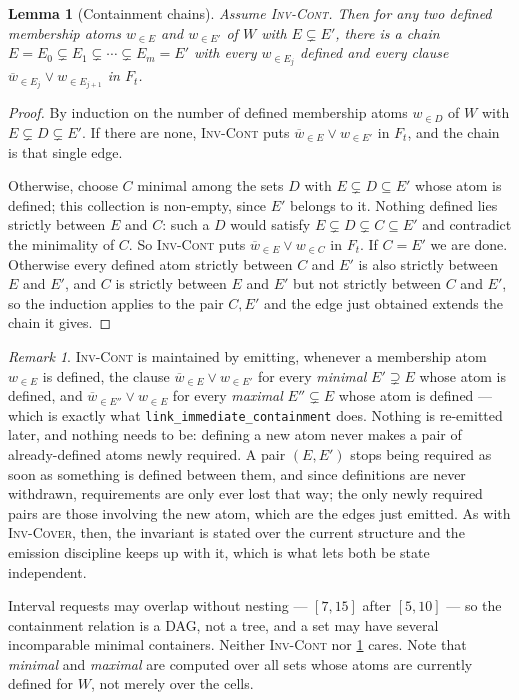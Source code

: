 \documentclass[11pt,a4paper]{article}
\theoremstyle{plain}
\newtheorem{lemmaN}{Lemma}
\theoremstyle{definition}
\theoremstyle{remark}
\newtheorem*{remark}{Remark}
\newcommand{\atset}[2]{#1_{\in #2}}
\newcommand{\natset}[2]{\overline{#1}_{\in #2}}
\newcommand{\inv}[1]{\textnormal{\textsc{Inv-#1}}}
\newcommand{\code}[1]{\texttt{#1}}
\newcommand{\invCover}{\inv{Cover}}
\newcommand{\invCont}{\inv{Cont}}
\begin{document}
\begin{lemmaN}[Containment chains]
\label{lem:contclosure}
Assume \invCont{}.  Then for any two defined membership atoms $\atset{w}{E}$ and
$\atset{w}{E'}$ of $W$ with $E\subsetneq E'$, there is a chain
$E=E_0\subsetneq E_1\subsetneq\cdots\subsetneq E_m=E'$ with every
$\atset{w}{E_j}$ defined and every clause
$\natset{w}{E_j}\vee\atset{w}{E_{j+1}}$ in $F_t$.
\end{lemmaN}

\begin{proof}
By induction on the number of defined membership atoms $\atset{w}{D}$ of $W$ with
$E\subsetneq D\subsetneq E'$.  If there are none, \invCont{} puts
$\natset{w}{E}\vee\atset{w}{E'}$ in $F_t$, and the chain is that single edge.

Otherwise, choose $C$ minimal among the sets $D$ with $E\subsetneq D\subseteq
E'$ whose atom is defined; this collection is non-empty, since $E'$ belongs to
it.  Nothing defined lies strictly between $E$ and $C$: such a $D$ would satisfy
$E\subsetneq D\subsetneq C\subseteq E'$ and contradict the minimality of $C$.
So \invCont{} puts $\natset{w}{E}\vee\atset{w}{C}$ in $F_t$.  If $C=E'$ we are
done.  Otherwise every defined atom strictly between $C$ and $E'$ is also
strictly between $E$ and $E'$, and $C$ is strictly between $E$ and $E'$ but not
strictly between $C$ and $E'$, so the induction applies to the pair $C,E'$ and
the edge just obtained extends the chain it gives.
\end{proof}

\begin{remark}
\invCont{} is maintained by emitting, whenever a membership atom $\atset{w}{E}$ is
defined, the clause $\natset{w}{E}\vee\atset{w}{E'}$ for every \emph{minimal}
$E'\supsetneq E$ whose atom is defined, and $\natset{w}{E''}\vee\atset{w}{E}$
for every \emph{maximal} $E''\subsetneq E$ whose atom is defined --- which is
exactly what \code{link\_immediate\_containment} does.  Nothing is re-emitted
later, and nothing needs to be: defining a new atom never makes a pair of
already-defined atoms newly required.  A pair $(E,E')$ stops being required as
soon as something is defined between them, and since definitions are never
withdrawn, requirements are only ever lost that way; the only newly required
pairs are those involving the new atom, which are the edges just emitted.  As with
\invCover{}, then, the invariant is stated over the current structure and the
emission discipline keeps up with it, which is what lets both be state
independent.

Interval requests may overlap without nesting --- $[7,15]$ after $[5,10]$ ---
so the containment relation is a DAG, not a tree, and a set may have several
incomparable minimal containers.  Neither \invCont{} nor \cref{lem:contclosure}
cares.  Note that \emph{minimal} and \emph{maximal} are computed over all sets
whose atoms are currently defined for $W$, not merely over the cells.
\end{remark}
\end{document}
